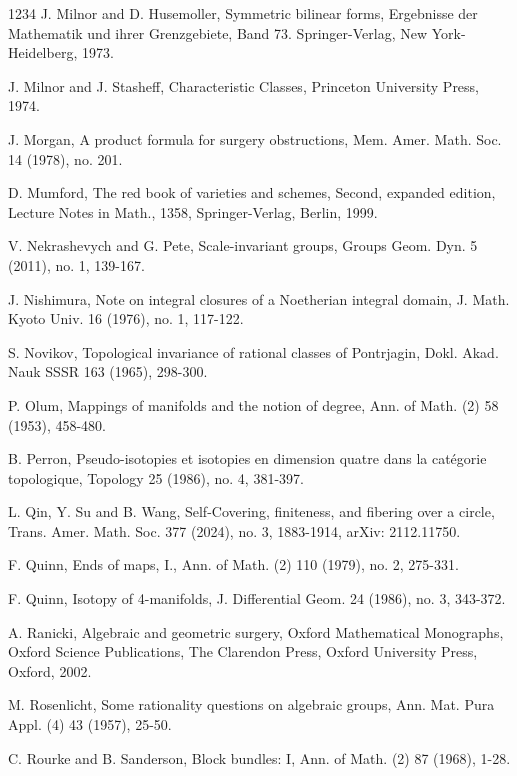 \documentclass[12pt]{amsart}
\theoremstyle{plain}
\theoremstyle{definition}
\theoremstyle{question}
\theoremstyle{remark}
\theoremstyle{assumption}
\numberwithin{equation}{section}
\theoremstyle{bigthm}
\begin{document}
\begin{thebibliography}{1234}
 J. Milnor and D. Husemoller, Symmetric bilinear forms, Ergebnisse der Mathematik und ihrer Grenzgebiete, Band 73. Springer-Verlag, New York-Heidelberg, 1973.

 J. Milnor and J. Stasheff, Characteristic Classes, Princeton University Press, 1974.

 J. Morgan, A product formula for surgery obstructions, Mem. Amer. Math. Soc. 14 (1978), no. 201.

 D. Mumford, The red book of varieties and schemes, Second, expanded edition, Lecture Notes in Math., 1358, Springer-Verlag, Berlin, 1999.

 V. Nekrashevych and G. Pete, Scale-invariant groups, Groups Geom. Dyn. 5 (2011), no. 1, 139-167.

 J. Nishimura, Note on integral closures of a Noetherian integral domain, J. Math. Kyoto Univ. 16 (1976), no. 1, 117-122.

 S. Novikov, Topological invariance of rational classes of Pontrjagin, Dokl. Akad. Nauk SSSR 163 (1965), 298-300.

 P. Olum, Mappings of manifolds and the notion of degree, Ann. of Math. (2) 58 (1953), 458-480.

 B. Perron, Pseudo-isotopies et isotopies en dimension quatre dans la cat\'{e}gorie topologique, Topology 25 (1986), no. 4, 381-397.

 L. Qin, Y. Su and B. Wang, Self-Covering, finiteness, and fibering over a circle, Trans. Amer. Math. Soc. 377 (2024), no. 3, 1883-1914, arXiv: 2112.11750.

 F. Quinn, Ends of maps, I., Ann. of Math. (2) 110 (1979), no. 2, 275-331.

 F. Quinn, Isotopy of 4-manifolds, J. Differential Geom. 24 (1986), no. 3, 343-372.

 A. Ranicki, Algebraic and geometric surgery, Oxford Mathematical Monographs, Oxford Science Publications, The Clarendon Press, Oxford University Press, Oxford, 2002.

 M. Rosenlicht, Some rationality questions on algebraic groups, Ann. Mat. Pura Appl. (4) 43 (1957), 25-50.

 C. Rourke and B. Sanderson, Block bundles: I, Ann. of Math. (2) 87 (1968), 1-28.


\end{thebibliography}
\end{document}
